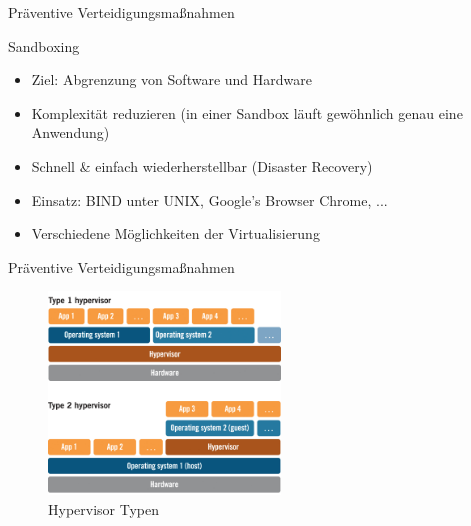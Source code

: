 \begin{frame}{Präventive Verteidigungsmaßnahmen}
  \begin{block}{Sandboxing}
    \begin{itemize}[<+->]
      \item Ziel: Abgrenzung von Software und Hardware
      \item Komplexität reduzieren (in einer Sandbox läuft gewöhnlich genau eine Anwendung)
      \item Schnell \& einfach wiederherstellbar (Disaster Recovery)
      \item Einsatz: BIND unter UNIX, Google's Browser Chrome, ...
      \item Verschiedene Möglichkeiten der Virtualisierung
    \end{itemize}
  \end{block}
\end{frame}

\begin{frame}{Präventive Verteidigungsmaßnahmen}
  \begin{figure}
    \centering
    \includegraphics[width=0.55\textwidth]{assets/hypervisor}
    \caption{Hypervisor Typen \footnotemark}
  \end{figure}

\end{frame}

